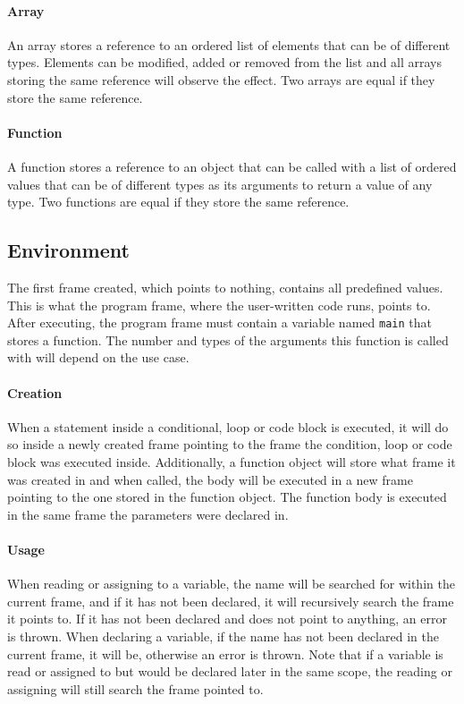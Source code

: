 \paragraph{Array}

An array stores a reference to an ordered list of elements that can be of different types. Elements can be modified, added or removed from the list and all arrays storing the same reference will observe the effect. Two arrays are equal if they store the same reference.

\paragraph{Function}

A function stores a reference to an object that can be called with a list of ordered values that can be of different types as its arguments to return a value of any type. Two functions are equal if they store the same reference.

\subsection{Environment}

The first frame created, which points to nothing, contains all predefined values. This is what the program frame, where the user-written code runs, points to. After executing, the program frame must contain a variable named \verb|main| that stores a function. The number and types of the arguments this function is called with will depend on the use case.

\paragraph{Creation}

When a statement inside a conditional, loop or code block is executed, it will do so inside a newly created frame pointing to the frame the condition, loop or code block was executed inside. Additionally, a function object will store what frame it was created in and when called, the body will be executed in a new frame pointing to the one stored in the function object. The function body is executed in the same frame the parameters were declared in.

\paragraph{Usage}

When reading or assigning to a variable, the name will be searched for within the current frame, and if it has not been declared, it will recursively search the frame it points to. If it has not been declared and does not point to anything, an error is thrown. When declaring a variable, if the name has not been declared in the current frame, it will be, otherwise an error is thrown. Note that if a variable is read or assigned to but would be declared later in the same scope, the reading or assigning will still search the frame pointed to.

